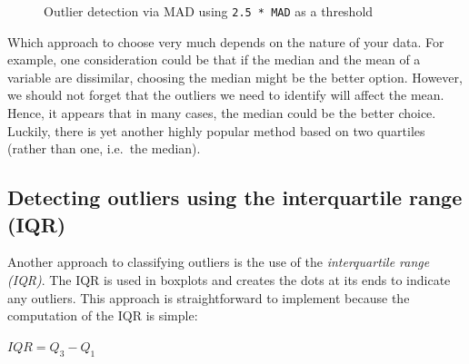 \documentclass[
  letterpaper,
]{krantz}
\begin{document}
\begin{figure}


\caption{\label{fig-MAD2-outlier-detection}Outlier detection via MAD
using \texttt{2.5\ *\ MAD} as a threshold}

\end{figure}%

Which approach to choose very much depends on the nature of your data.
For example, one consideration could be that if the median and the mean
of a variable are dissimilar, choosing the median might be the better
option. However, we should not forget that the outliers we need to
identify will affect the mean. Hence, it appears that in many cases, the
median could be the better choice. Luckily, there is yet another highly
popular method based on two quartiles (rather than one, i.e.~the
median).

\subsection{Detecting outliers using the interquartile range
(IQR)}\label{sec-outliers-iqr}

Another approach to classifying outliers is the use of the
\emph{interquartile range (IQR)}. The IQR is used in boxplots and
creates the dots at its ends to indicate any outliers. This approach is
straightforward to implement because the computation of the IQR is
simple:

\label{iqr-formula}
\(IQR = Q_{3}-Q_{1}\)
\end{document}
